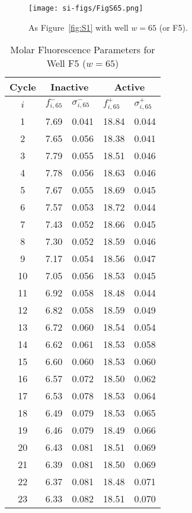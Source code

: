                 \begin{figure}
                    \centering
                    \texttt{[image: si-figs/FigS65.png]}
                    \caption{
                        As Figure~\ref{fig:S1} with well $w=65$ (or F5).
                    }
                \end{figure}
                \clearpage
    \begin{table}
        \caption{Molar Fluorescence Parameters for Well F5 ($w=65$)}
        \centering
        \begin{tabular}{c|ll|ll}
            Cycle & \multicolumn{2}{c|}{Inactive} & \multicolumn{2}{c}{Active} \\
            \hline
            $i$ & $f_{i,65}^{-}$ & $\sigma_{i,65}^{-}$ &  $f_{i,65}^{+}$ & $\sigma_{i,65}^{+}$ \\
            \hline
    1 & 7.69 & 0.041 & 18.84 & 0.044 \\
2 & 7.65 & 0.056 & 18.38 & 0.041 \\
3 & 7.79 & 0.055 & 18.51 & 0.046 \\
4 & 7.78 & 0.056 & 18.63 & 0.046 \\
5 & 7.67 & 0.055 & 18.69 & 0.045 \\
6 & 7.57 & 0.053 & 18.72 & 0.044 \\
7 & 7.43 & 0.052 & 18.66 & 0.045 \\
8 & 7.30 & 0.052 & 18.59 & 0.046 \\
9 & 7.17 & 0.054 & 18.56 & 0.047 \\
10 & 7.05 & 0.056 & 18.53 & 0.045 \\
11 & 6.92 & 0.058 & 18.48 & 0.044 \\
12 & 6.82 & 0.058 & 18.59 & 0.049 \\
13 & 6.72 & 0.060 & 18.54 & 0.054 \\
14 & 6.62 & 0.061 & 18.53 & 0.058 \\
15 & 6.60 & 0.060 & 18.53 & 0.060 \\
16 & 6.57 & 0.072 & 18.50 & 0.062 \\
17 & 6.53 & 0.078 & 18.53 & 0.064 \\
18 & 6.49 & 0.079 & 18.53 & 0.065 \\
19 & 6.46 & 0.079 & 18.49 & 0.066 \\
20 & 6.43 & 0.081 & 18.51 & 0.069 \\
21 & 6.39 & 0.081 & 18.50 & 0.069 \\
22 & 6.37 & 0.081 & 18.48 & 0.071 \\
23 & 6.33 & 0.082 & 18.51 & 0.070 \\

\end{tabular}
\end{table}
